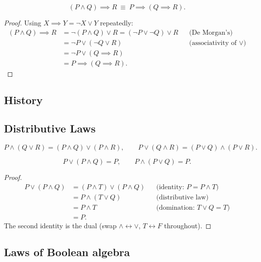 \bigskip
\begin{proposition}
\[
(P \wedge Q) \implies R \ \equiv \ P \implies (Q \implies R).
\]
\end{proposition}
\begin{proof}
Using $X\implies Y = \neg X \vee Y$ repeatedly:
\begin{align*}
(P\wedge Q)\implies R &= \neg(P\wedge Q)\vee R = (\neg P \vee \neg Q)\vee R && \text{(De Morgan's)}\\
&= \neg P \vee (\neg Q \vee R) && \text{(associativity of $\vee$)}\\
&= \neg P \vee (Q \implies R) \\
&= P \implies (Q \implies R).
\end{align*}
\end{proof}

\subsection{History}
\label{sec:4-13}

\subsection{Distributive Laws}
\label{sec:4-14}

\begin{theorem}
\[
P \wedge (Q\vee R) = (P\wedge Q)\vee(P\wedge R), \qquad P \vee (Q\wedge R) = (P\vee Q)\wedge(P\vee R).
\]
\end{theorem}

\bigskip
\begin{proposition}
\[
P \vee (P\wedge Q) = P, \qquad P \wedge (P\vee Q) = P.
\]
\end{proposition}
\begin{proof}
\begin{align*}
P \vee (P\wedge Q) &= (P\wedge T)\vee(P\wedge Q) && \text{(identity: $P = P\wedge T$)}\\
&= P \wedge (T \vee Q) && \text{(distributive law)}\\
&= P \wedge T && \text{(domination: $T\vee Q=T$)}\\
&= P.
\end{align*}
The second identity is the dual (swap $\wedge \leftrightarrow \vee$, $T \leftrightarrow F$ throughout).
\end{proof}

\subsection{Laws of Boolean algebra}
\label{sec:4-15}


